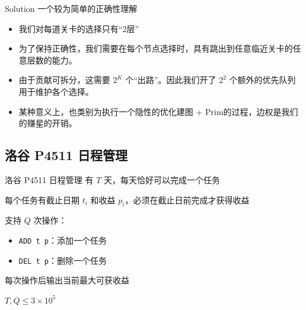 ﻿\documentclass[aspectratio=169,handout]{ctexbeamer}
\begin{document}
\begin{frame}{Solution}
    一个较为简单的正确性理解
    \pause
    \begin{itemize}
        \item 我们对每道关卡的选择只有“2层”
        \pause
        \item 为了保持正确性，我们需要在每个节点选择时，具有跳出到任意临近关卡的任意层数的能力。
        \pause
        \item 由于贡献可拆分，这需要 $2^K$ 个“出路”。因此我们开了 $2^2$ 个额外的优先队列用于维护各个选择。
        \pause
        \item 某种意义上，也类别为执行一个隐性的优化建图 + Prim的过程，边权是我们的赚星的开销。
    \end{itemize}
\end{frame}









\subsection{洛谷 P4511 日程管理}
\begin{frame}{洛谷 P4511 日程管理}
    有 $T$ 天，每天恰好可以完成一个任务

每个任务有截止日期 $t_i$ 和收益 $p_i$，必须在截止日前完成才获得收益

支持 $Q$ 次操作：

\begin{itemize}
    \item \texttt{ADD t p}：添加一个任务
    \item \texttt{DEL t p}：删除一个任务
\end{itemize}

每次操作后输出当前最大可获收益

$T,Q\leq 3\times 10^5$
\end{frame}
\end{document}
